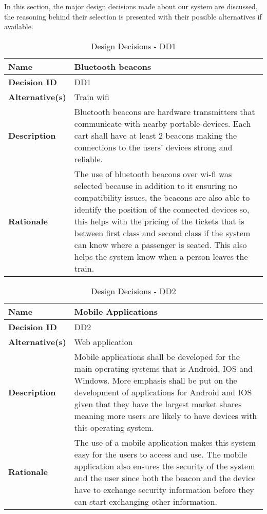 
In this section, the major design decisions made about our system are discussed, the reasoning behind their selection is presented with their possible alternatives if available.
\begin{table}[H]
	\centering
	\begin{tabularx}{\linewidth}{l|X}
		\textbf{Name}      & Bluetooth beacons \\ \hline
		\textbf{Decision ID}  & DD1 \\ \hline
		\textbf{Alternative(s)}     & Train wifi  \\ \hline
		\textbf{Description}   & Bluetooth beacons are hardware transmitters that communicate with nearby portable devices. Each cart shall have at least 2 beacons making the connections to the users' devices strong and reliable. \\ \hline
		\textbf{Rationale}    & The use of bluetooth beacons over wi-fi was selected because in addition to it ensuring no compatibility issues, the beacons are also able to identify the position of the connected devices so, this helps with the pricing of the tickets that is between first class and second class if the system can know where a passenger is seated. This also helps the system know when a person leaves the train. \\ \hline
	\end{tabularx}
	\caption{Design Decisions - DD1}
	\label{tbl:uc1}
\end{table}

\begin{table}[H]
	\centering
	\begin{tabularx}{\linewidth}{l|X}
		\textbf{Name}      & Mobile Applications\\ \hline
		\textbf{Decision ID}  & DD2 \\ \hline
		\textbf{Alternative(s)}     & Web application \\ \hline
		\textbf{Description}   & Mobile applications shall be developed for the main operating systems that is Android, IOS and Windows. More emphasis shall be put on the development of applications for Android and IOS given that they have the largest market shares meaning more users are likely to have devices with this operating system.\\ \hline
		\textbf{Rationale}    & The use of a mobile application makes this system easy for the users to access and use. The mobile application also ensures the security of the system and the user since both the beacon and the device have to exchange security information before they can start exchanging other information. \\ \hline
	\end{tabularx}
	\caption{Design Decisions - DD2}
	\label{tbl:uc1}
\end{table}

